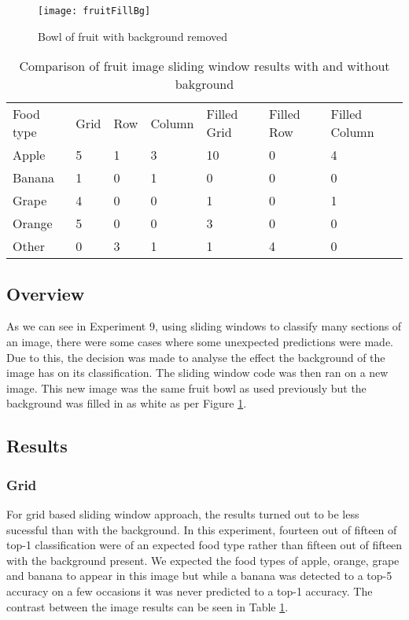 \begin{figure}
    \texttt{[image: fruitFillBg]}
    \caption{Bowl of fruit with background removed}
    \label{fig:filledFruit}
\end{figure}

\begin{table}[]
    \centering
    \caption{Comparison of fruit image sliding window results with and without
    bakground}
    \label{comparisionFruitTable}
    \begin{tabular}{lllllll}
        Food type & Grid & Row & Column & Filled Grid & Filled Row & Filled
        Column \\
        Apple     & 5    & 1   & 3      & 10          & 0          & 4
        \\
        Banana    & 1    & 0   & 1      & 0           & 0          & 0
        \\
        Grape     & 4    & 0   & 0      & 1           & 0          & 1
        \\
        Orange    & 5    & 0   & 0      & 3           & 0          & 0
        \\
        Other     & 0    & 3   & 1      & 1           & 4          & 0            
    \end{tabular}
\end{table}

\subsection*{Overview}
As we can see in Experiment 9, using sliding windows to classify many sections
of an image, there were some cases where some unexpected predictions were made.
Due to this, the decision was made to analyse the effect the background of the
image has on its classification. The sliding window code was then ran on a new
image. This new image was the same fruit bowl as used previously but the
background was filled in as white as per Figure \ref{fig:filledFruit}.

\subsection*{Results}
\subsubsection*{Grid}
For grid based sliding window approach, the results turned out to be less
sucessful than with the background. In this experiment, fourteen out of fifteen
of top-1 classification were of an expected food type rather than fifteen out of
fifteen with the background present. We expected the food types of apple,
orange, grape and banana to appear in this image but while a banana was detected
to a top-5 accuracy on a few occasions it was never predicted to a top-1
accuracy. The contrast between the image results can be seen in Table
\ref{comparisionFruitTable}.

